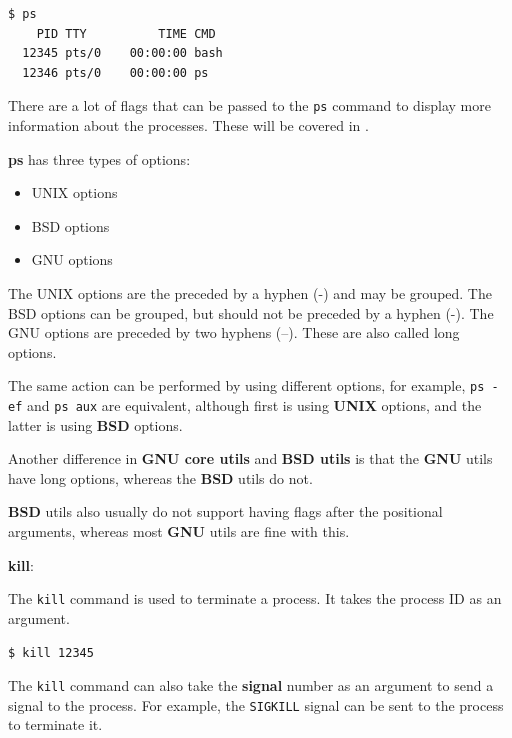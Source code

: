 \begin{lstlisting}[language=bash]
  $ ps
    PID TTY          TIME CMD
  12345 pts/0    00:00:00 bash
  12346 pts/0    00:00:00 ps
\end{lstlisting}

There are a lot of flags that can be passed to the \texttt{ps} command to display more information about the processes. These will be covered in .

\begin{remark}
  \textbf{ps} has three types of options:
  \begin{itemize}
    \item UNIX options
    \item BSD options
    \item GNU options
  \end{itemize}
  The UNIX options are the preceded by a hyphen (-{}) and may be grouped.
  The BSD options can be grouped, but should not be preceded by a hyphen (-{}).
  The GNU options are preceded by two hyphens (--).
  These are also called long options.

  The same action can be performed by using different options, for example, \texttt{ps -ef} and \texttt{ps aux} are equivalent, although first is using \textbf{UNIX} options, and the latter is using \textbf{BSD} options.

  Another difference in \textbf{GNU core utils} and \textbf{BSD utils} is that the \textbf{GNU} utils have long options, whereas the \textbf{BSD} utils do not.

  \textbf{BSD} utils also usually do not support having flags after the positional arguments, whereas most \textbf{GNU} utils are fine with this.
\end{remark}


\textbf{kill}:

The \texttt{kill} command is used to terminate a process.
It takes the process ID as an argument.

\begin{lstlisting}[language=bash]
  $ kill 12345
\end{lstlisting}

The \texttt{kill} command can also take the \textbf{signal} number as an argument to send a signal to the process.
For example, the \texttt{SIGKILL} signal can be sent to the process to terminate it.

